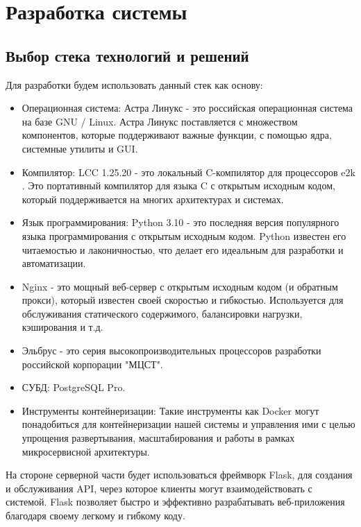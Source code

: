 \chapter{  Разработка системы}
\label{cha:impl}

\section{Выбор стека технологий и решений}

Для разработки будем использовать данный стек как основу:

\begin{itemize}
    \item Операционная система: Астра Линукс - это российская операционная система на базе GNU / Linux. Астра Линукс поставляется с множеством компонентов, которые поддерживают важные функции, с помощью ядра, системные утилиты и GUI. \cite{dev:astra_linux}
    \item Компилятор: LCC 1.25.20 - это локальный C-компилятор для процессоров e2k \cite{dev:elbrus_lcc}. Это портативный компилятор для языка C с открытым исходным кодом, который поддерживается на многих архитектурах и системах.
    \item Язык программирования: Python 3.10 - это последняя версия популярного языка программирования с открытым исходным кодом. Python известен его читаемостью и лаконичностью, что делает его идеальным для разработки и автоматизации.
    \item Nginx - это мощный веб-сервер с открытым исходным кодом (и обратным прокси), который известен своей скоростью и гибкостью. Используется для обслуживания статического содержимого, балансировки нагрузки, кэширования и т.д.
    \item Эльбрус - это серия высокопроизводительных процессоров разработки российской корпорации "МЦСТ". \cite{dev:elbrus_cpu}
    \item СУБД: PostgreSQL Pro.
    \item Инструменты контейнеризации: Такие инструменты как Docker могут понадобиться для контейнеризации нашей системы и управления ими с целью упрощения развертывания, масштабирования и работы в рамках микросервисной архитектуры.


\end{itemize}

На стороне серверной части будет использоваться фреймворк Flask, для создания и обслуживания API, через которое клиенты могут взаимодействовать с системой. Flask позволяет быстро и эффективно разрабатывать веб-приложения благодаря своему легкому и гибкому коду. 

